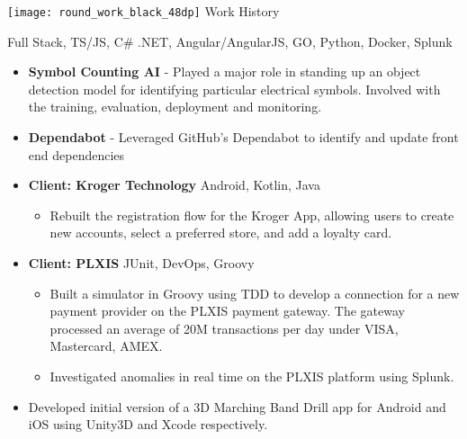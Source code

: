 {\noindent \texttt{[image: round\_work\_black\_48dp]} \hspace{0.25pc}  \large Work History}\hspace{1pc}{\noindent\rule{36.75pc}{0.4pt}}

\vspace{1pc}


{\color{gray} Full Stack, TS/JS, C\# .NET, Angular/AngularJS, GO, Python, Docker, Splunk}

\begin{itemize}
	\item \textbf{Symbol Counting AI} - Played a major role in standing up an object detection model for identifying particular electrical symbols. Involved with the training, evaluation, deployment and monitoring.
	\item \textbf{Dependabot} - Leveraged GitHub's Dependabot to identify and update front end dependencies
\end{itemize}


\begin{itemize}
	\item \textbf{Client: Kroger Technology} \hspace{0.5pc} {\color{gray}Android, Kotlin, Java}
	\begin{itemize}
		\item Rebuilt the registration flow for the Kroger App, allowing users to create new accounts, select a preferred store, and add a loyalty card. 
	\end{itemize}
	\item \textbf{Client: PLXIS} \hspace{0.5pc} {\color{gray} JUnit, DevOps, Groovy}
	\begin{itemize}
		\item Built a simulator in Groovy using TDD to develop a connection for a new payment provider on the PLXIS payment gateway. The gateway processed an average of 20M transactions per day under VISA, Mastercard, AMEX.
		
		\item Investigated anomalies in real time on the PLXIS platform using Splunk.
	\end{itemize}
	
\end{itemize}

\begin{itemize}
	\item Developed initial version of a 3D Marching Band Drill app for Android and iOS using Unity3D and Xcode respectively.
\end{itemize}